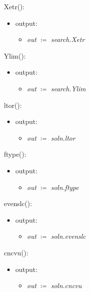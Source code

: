 \documentclass[12pt, titlepage]{article}
\begin{document}
\noindent Xetr():
\begin{itemize}
	\item output:
	\begin{itemize}
		\item[] \textit{out} $\coloneqq$ \textit{search.Xetr}\\
	\end{itemize}
\end{itemize}

\noindent Ylim():
\begin{itemize}
	\item output:
	\begin{itemize}
		\item[] \textit{out} $\coloneqq$ \textit{search.Ylim}\\
	\end{itemize}
\end{itemize}

\noindent ltor():
\begin{itemize}
	\item output:
	\begin{itemize}
		\item[] \textit{out} $\coloneqq$ \textit{soln.ltor}\\
	\end{itemize}
\end{itemize}

\noindent ftype():
\begin{itemize}
	\item output:
	\begin{itemize}
		\item[] \textit{out} $\coloneqq$ \textit{soln.ftype}\\
	\end{itemize}
\end{itemize}

\noindent evenslc():
\begin{itemize}
	\item output:
	\begin{itemize}
		\item[] \textit{out} $\coloneqq$ \textit{soln.evenslc}\\
	\end{itemize}
\end{itemize}

\noindent cncvu():
\begin{itemize}
	\item output:
	\begin{itemize}
		\item[] \textit{out} $\coloneqq$ \textit{soln.cncvu}\\
	\end{itemize}
\end{itemize}
\end{document}
